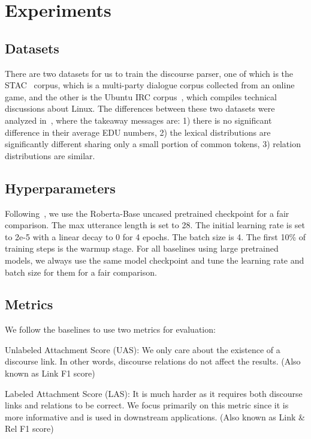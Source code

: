 \documentclass[11pt]{article}
\begin{document}
\section{Experiments}
\label{sec:exp}
\subsection{Datasets}
There are two datasets for us to train the discourse parser, one of which is the STAC~\cite{asher2016discourse} corpus, which is a multi-party dialogue corpus collected from an online game, and the other is the Ubuntu IRC corpus~\cite{li2020molweni}, which compiles technical discussions about Linux. The differences between these two datasets were analyzed in~\citet{liu-chen-2021-improving}, where the takeaway messages are: 1) there is no significant difference in their average EDU numbers, 2) the lexical distributions are significantly different sharing only a small portion of common
tokens, 3) relation distributions are similar.


\subsection{Hyperparameters}
Following~\citet{liu-chen-2021-improving}, we use the Roberta-Base uncased pretrained checkpoint for a fair comparison. The max utterance length is set to 28. The initial learning rate is set to 2e-5 with a linear decay to 0 for 4 epochs. The batch size is 4. The first 10\% of training steps is the warmup stage. For all baselines using large pretrained models, we always use the same model checkpoint and tune the learning rate and batch size for them for a fair comparison.

\subsection{Metrics}
We follow the baselines to use two metrics for evaluation:
\begin{compactitem}
    \item Unlabeled Attachment Score (UAS): We only care about the existence of a discourse link. In other words, discourse relations do not affect the results. (Also known as Link F1 score)
    \item Labeled Attachment Score (LAS): It is much harder as it requires both discourse links and relations to be correct. We focus primarily on this metric since it is more informative and is used in downstream applications. (Also known as Link \& Rel F1 score)
\end{compactitem}
\end{document}

